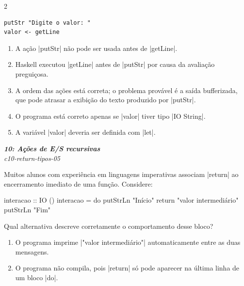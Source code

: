 \documentclass[a4paper,10pt,brazil]{article}
\begin{document}
\begin{multicols}{2}
\begin{verbatim}
putStr "Digite o valor: "
valor <- getLine
\end{verbatim}

\begin{enumerate}
  \item A ação \haskellinline|putStr| não pode ser usada antes de \haskellinline|getLine|.

  \item Haskell executou \haskellinline|getLine| antes de \haskellinline|putStr| por causa da avaliação preguiçosa.

  \item A ordem das ações está correta; o problema provável é a saída bufferizada, que pode atrasar a exibição do texto produzido por \haskellinline|putStr|.

  \item O programa está correto apenas se \haskellinline|valor| tiver tipo \haskellinline|IO String|.

  \item A variável \haskellinline|valor| deveria ser definida com \haskellinline|let|.


\end{enumerate}

\begin{flushright}
  \footnotesize
  \textit{\textbf{10: Ações de E/S recursivas}}\\
  \textit{c10-return-tipos-05}\\

\end{flushright}
Muitos alunos com experiência em linguagens imperativas associam \haskellinline|return| ao encerramento imediato de uma função. Considere:

\begin{haskellcode}
interacao :: IO ()
interacao = do
  putStrLn "Início"
  return "valor intermediário"
  putStrLn "Fim"
\end{haskellcode}

Qual alternativa descreve corretamente o comportamento desse bloco?

\begin{enumerate}
  \item O programa imprime \haskellinline|"valor intermediário"| automaticamente entre as duas mensagens.

  \item O programa não compila, pois \haskellinline|return| só pode aparecer na última linha de um bloco \haskellinline|do|.


\end{enumerate}
\end{multicols}
\end{document}
